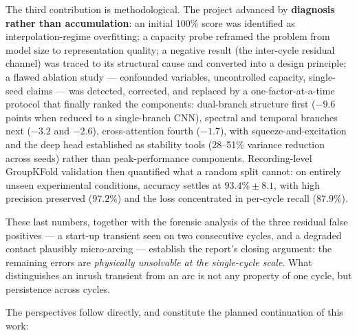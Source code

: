 \medskip

The third contribution is methodological. The project advanced by \textbf{diagnosis rather than accumulation}: an initial 100\% score was identified as interpolation-regime overfitting; a capacity probe reframed the problem from model size to representation quality; a negative result (the inter-cycle residual channel) was traced to its structural cause and converted into a design principle; a flawed ablation study --- confounded variables, uncontrolled capacity, single-seed claims --- was detected, corrected, and replaced by a one-factor-at-a-time protocol that finally ranked the components: dual-branch structure first ($-9.6$ points when reduced to a single-branch CNN), spectral and temporal branches next ($-3.2$ and $-2.6$), cross-attention fourth ($-1.7$), with squeeze-and-excitation and the deep head established as stability tools (28--51\% variance reduction across seeds) rather than peak-performance components. Recording-level GroupKFold validation then quantified what a random split cannot: on entirely unseen experimental conditions, accuracy settles at $93.4\% \pm 8.1$, with high precision preserved ($97.2\%$) and the loss concentrated in per-cycle recall ($87.9\%$).

\medskip

These last numbers, together with the forensic analysis of the three residual false positives --- a start-up transient seen on two consecutive cycles, and a degraded contact plausibly micro-arcing --- establish the report's closing argument: the remaining errors are \emph{physically unsolvable at the single-cycle scale}. What distinguishes an inrush transient from an arc is not any property of one cycle, but persistence across cycles.

\medskip

The perspectives follow directly, and constitute the planned continuation of this work:

